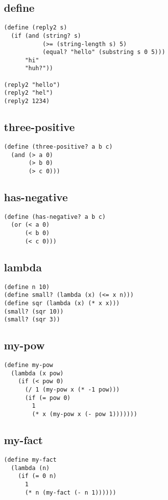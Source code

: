 \begin{multicols}{3}[]

\subsection{define}
\begin{lstlisting}
(define (reply2 s)
  (if (and (string? s)
           (>= (string-length s) 5)
           (equal? "hello" (substring s 0 5)))
      "hi"
      "huh?"))

(reply2 "hello")
(reply2 "hel")
(reply2 1234)
\end{lstlisting}

\subsection{three-positive}
\begin{lstlisting}
(define (three-positive? a b c)
  (and (> a 0)
	   (> b 0)
	   (> c 0)))
\end{lstlisting}

\subsection{has-negative}
\begin{lstlisting}
(define (has-negative? a b c)
  (or (< a 0)
	  (< b 0)
	  (< c 0)))
\end{lstlisting}

\subsection{lambda}%
\label{sub:lambda}
\begin{lstlisting}
(define n 10)
(define small? (lambda (x) (<= x n)))
(define sqr (lambda (x) (* x x)))
(small? (sqr 10))
(small? (sqr 3))
\end{lstlisting}

\subsection{my-pow}%
\label{sub:my_pow}
\begin{lstlisting}
(define my-pow
  (lambda (x pow)
	(if (< pow 0)
	  (/ 1 (my-pow x (* -1 pow)))
	  (if (= pow 0)
	    1
	    (* x (my-pow x (- pow 1)))))))
\end{lstlisting}

\subsection{my-fact}%
\label{sub:my_fact}
\begin{lstlisting}
(define my-fact
  (lambda (n)
    (if (= 0 n)
      1
      (* n (my-fact (- n 1))))))
\end{lstlisting}


\end{multicols}

